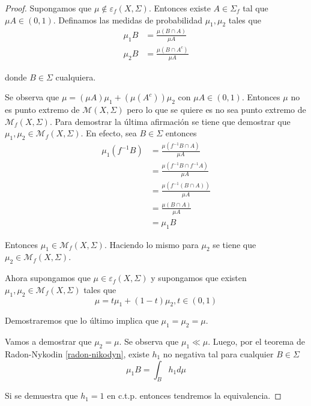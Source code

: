 \begin{proof}
	Supongamos que $\mu \notin \varepsilon_f(X,\Sigma)$. Entonces existe $A \in \Sigma_f$ tal que $\mu A \in (0,1)$. Definamos las medidas de probabilidad $\mu_1,\mu_2$ tales que
	\begin{align}
		\mu_1 B &= \frac{\mu(B \cap A)}{\mu A}\\
		\mu_2 B &= \frac{\mu(B \cap A^c)}{\mu A}
	\end{align}
	
	donde $B \in \Sigma$ cualquiera.
	
	Se observa que $\mu = (\mu A) \mu_1 + (\mu(A^c)) \mu_2$ con $\mu A \in (0,1)$. Entonces $\mu$ no es punto extremo de $\mathcal{M}(X,\Sigma)$ pero lo que se quiere es no sea punto extremo de $\mathcal{M}_f(X,\Sigma)$. Para demostrar la última afirmación se tiene que demostrar que $\mu_1,\mu_2 \in \mathcal{M}_f(X,\Sigma)$. En efecto, sea $B \in \Sigma$ entonces
	\begin{align}
		\mu_1(f^{-1}B) &= \frac{\mu(f^{-1}B \cap A)}{\mu A}\\
		&= \frac{\mu(f^{-1}B \cap f^{-1}A)}{\mu A}\\
		&= \frac{\mu(f^{-1}(B \cap A))}{\mu A}\\
		&= \frac{\mu (B \cap A)}{\mu A}\\		
		&= \mu_1 B
	\end{align}
	
	Entonces $\mu_1 \in \mathcal{M}_f(X,\Sigma)$. Haciendo lo mismo para $\mu_2$ se tiene que\\
	$\mu_2 \in \mathcal{M}_f(X,\Sigma)$.
	
	Ahora supongamos que $\mu \in \varepsilon_f(X,\Sigma)$ y supongamos que existen\\
	$\mu_1,\mu_2 \in \mathcal{M}_f(X,\Sigma)$ tales que
	\begin{equation}
		\mu = t\mu_1 + (1-t)\mu_2, t \in (0,1)
	\end{equation}
	
	Demostraremos que lo último implica que $\mu_1=\mu_2=\mu$. 
	
	Vamos a demostrar que $\mu_2=\mu$. Se observa que $\mu_1 \ll \mu$. Luego, por el teorema de Radon-Nykodin \ref{radon-nikodyn}, existe $h_1$ no negativa tal para cualquier $B \in \Sigma$
	\begin{equation}
		\mu_1 B = \int_B h_1 d\mu
	\end{equation}
	
	Si se demuestra que $h_1 = 1$ en c.t.p. entonces tendremos la equivalencia.
	

\end{proof}
